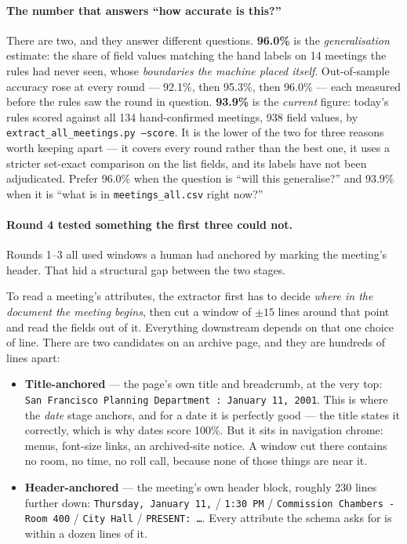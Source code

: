 \documentclass[11pt]{article}
\begin{document}
\paragraph{The number that answers ``how accurate is this?''} There are two, and they
answer different questions. \textbf{96.0\%} is the \emph{generalisation} estimate: the share
of field values matching the hand labels on 14 meetings the rules had never seen, whose
\emph{boundaries the machine placed itself}. Out-of-sample accuracy rose at every round ---
92.1\%, then 95.3\%, then 96.0\% --- each measured before the rules saw the round in
question. \textbf{93.9\%} is the \emph{current} figure: today's rules scored against all
134 hand-confirmed meetings, 938 field values, by \texttt{extract\_all\_meetings.py
--score}. It is the lower of the two for three reasons worth keeping apart --- it covers
every round rather than the best one, it uses a stricter set-exact comparison on the list
fields, and its labels have not been adjudicated. Prefer 96.0\% when the question is ``will
this generalise?'' and 93.9\% when it is ``what is in \texttt{meetings\_all.csv} right
now?''

\paragraph{Round 4 tested something the first three could not.} Rounds 1--3 all used windows
a human had anchored by marking the meeting's header. That hid a structural gap between the
two stages.

To read a meeting's attributes, the extractor first has to decide \emph{where in the
document the meeting begins}, then cut a window of $\pm15$ lines around that point and read
the fields out of it. Everything downstream depends on that one choice of line. There are
two candidates on an archive page, and they are hundreds of lines apart:

\begin{itemize}
\item \textbf{Title-anchored} --- the page's own title and breadcrumb, at the very top:
\texttt{San Francisco Planning Department : January 11, 2001}. This is where the \emph{date}
stage anchors, and for a date it is perfectly good --- the title states it correctly, which
is why dates score 100\%. But it sits in navigation chrome: menus, font-size links, an
archived-site notice. A window cut there contains no room, no time, no roll call, because
none of those things are near it.
\item \textbf{Header-anchored} --- the meeting's own header block, roughly 230 lines further
down: \texttt{Thursday, January 11,} / \texttt{1:30 PM} / \texttt{Commission Chambers - Room
400} / \texttt{City Hall} / \texttt{PRESENT: \ldots}. Every attribute the schema asks for is
within a dozen lines of it.
\end{itemize}
\end{document}
